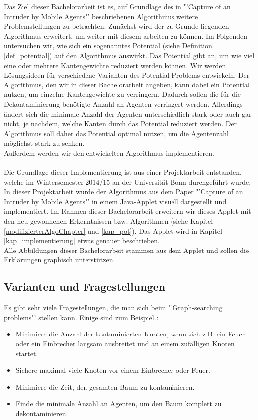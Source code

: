 Das Ziel dieser Bachelorarbeit ist es, auf Grundlage des in "'Capture of an Intruder by Mobile Agents"' \cite{cima_paper} beschriebenen Algorithmus weitere Problemstellungen zu betrachten. Zunächst wird der zu Grunde liegenden Algorithmus erweitert, um weiter mit diesem arbeiten zu können. Im Folgenden untersuchen wir, wie sich ein sogenanntes Potential (siehe Definition \ref{def_potential}) auf den Algorithmus auswirkt. Das Potential gibt an, um wie viel eine oder mehrere Kantengewichte reduziert werden können. Wir werden Lösungsideen für verschiedene Varianten des Potential-Problems entwickeln. Der Algorithmus, den wir in dieser Bachelorarbeit angeben, kann dabei ein Potential nutzen, um einzelne Kantengewichte zu verringern. Dadurch sollen die für die Dekontaminierung benötigte Anzahl an Agenten verringert werden. Allerdings ändert sich die minimale Anzahl der Agenten unterschiedlich stark oder auch gar nicht, je nachdem, welche Kanten durch das Potential reduziert werden. Der Algorithmus soll daher das Potential optimal nutzen, um die Agentenzahl möglichst stark zu senken.\\
Außerdem werden wir den entwickelten Algorithmus implementieren.
\\
\\
Die Grundlage dieser Implementierung ist aus einer Projektarbeit entstanden, welche im Wintersemester 2014/15 an der Universität Bonn durchgeführt wurde.
In dieser Projektarbeit wurde der Algorithmus aus dem Paper "'Capture of an Intruder by Mobile Agents"' \cite{cima_paper} in einem Java-Applet visuell dargestellt und implementiert. Im Rahmen dieser Bachelorarbeit erweitern wir dieses Applet mit den neu gewonnenen Erkenntnissen bzw. Algorithmen (siehe Kapitel \ref{modifizierterAlgoChapter} und \ref{kap_pot}). Das Applet wird in Kapitel \ref{kap_implementierung} etwas genauer beschrieben.\\
Alle Abbildungen dieser Bachelorarbeit stammen aus dem Applet und sollen die Erklärungen graphisch unterstützen.



\subsection{Varianten und Fragestellungen}


Es gibt sehr viele Fragestellungen, die man sich beim "'Graph-searching problems"' stellen kann. Einige sind zum Beispiel \cite{firefighterproblem_paper}:
\begin{itemize}
	\item Minimiere die Anzahl der kontaminierten Knoten, wenn sich z.B. ein Feuer oder ein Einbrecher langsam ausbreitet und an einem zufälligen Knoten startet.
	\item Sichere maximal viele Knoten vor einem Einbrecher oder Feuer.
	\item Minimiere die Zeit, den gesamten Baum zu kontaminieren.
	\item Finde die minimale Anzahl an  Agenten, um den Baum komplett zu dekontaminieren.
\end{itemize}

